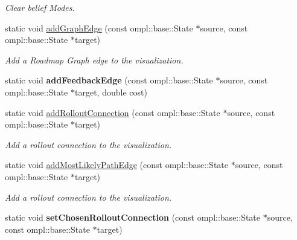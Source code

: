 \begin{DoxyCompactItemize}
\begin{DoxyCompactList}\small\item\em Clear belief Modes. \end{DoxyCompactList}\item 
\hypertarget{class_visualizer_a31ce4b4a4865921d5c8d72b94f6dd7a5}{static void \hyperlink{class_visualizer_a31ce4b4a4865921d5c8d72b94f6dd7a5}{add\-Graph\-Edge} (const ompl\-::base\-::\-State $\ast$source, const ompl\-::base\-::\-State $\ast$target)}\label{class_visualizer_a31ce4b4a4865921d5c8d72b94f6dd7a5}

\begin{DoxyCompactList}\small\item\em Add a Roadmap Graph edge to the visualization. \end{DoxyCompactList}\item 
\hypertarget{class_visualizer_a728bc4cf562902c5ba4a79aed4685875}{static void {\bfseries add\-Feedback\-Edge} (const ompl\-::base\-::\-State $\ast$source, const ompl\-::base\-::\-State $\ast$target, double cost)}\label{class_visualizer_a728bc4cf562902c5ba4a79aed4685875}

\item 
\hypertarget{class_visualizer_a207b9cdfc68a6d327ba04bd5d6b5e94e}{static void \hyperlink{class_visualizer_a207b9cdfc68a6d327ba04bd5d6b5e94e}{add\-Rollout\-Connection} (const ompl\-::base\-::\-State $\ast$source, const ompl\-::base\-::\-State $\ast$target)}\label{class_visualizer_a207b9cdfc68a6d327ba04bd5d6b5e94e}

\begin{DoxyCompactList}\small\item\em Add a rollout connection to the visualization. \end{DoxyCompactList}\item 
\hypertarget{class_visualizer_a364f1254d282cad1717ca9ad0c4b4081}{static void \hyperlink{class_visualizer_a364f1254d282cad1717ca9ad0c4b4081}{add\-Most\-Likely\-Path\-Edge} (const ompl\-::base\-::\-State $\ast$source, const ompl\-::base\-::\-State $\ast$target)}\label{class_visualizer_a364f1254d282cad1717ca9ad0c4b4081}

\begin{DoxyCompactList}\small\item\em Add a rollout connection to the visualization. \end{DoxyCompactList}\item 
\hypertarget{class_visualizer_a474b9dd973d8b1b490b33587ad9aa86d}{static void {\bfseries set\-Chosen\-Rollout\-Connection} (const ompl\-::base\-::\-State $\ast$source, const ompl\-::base\-::\-State $\ast$target)}\label{class_visualizer_a474b9dd973d8b1b490b33587ad9aa86d}


\end{DoxyCompactItemize}
